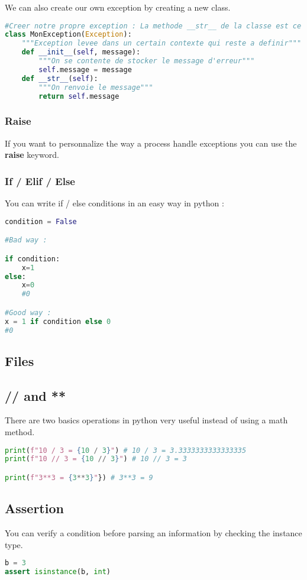 \documentclass[a4paper, 12pt]{article}
\begin{document}
We can also create our own exception by creating a new class.
\begin{lstlisting}[language=Python]
#Creer notre propre exception : La methode __str__ de la classe est ce qui est appele pour afficher le message d'erreur
class MonException(Exception):
    """Exception levee dans un certain contexte qui reste a definir"""
    def __init__(self, message):
        """On se contente de stocker le message d'erreur"""
        self.message = message
    def __str__(self):
        """On renvoie le message"""
        return self.message
\end{lstlisting}

\subsubsection{Raise}
\label{Raise}
If you want to personnalize the way a process handle exceptions you can use the \textbf{raise} keyword.


\subsubsection{If / Elif / Else}
\label{IEE}
You can write if / else conditions in an easy way in python :
\begin{lstlisting}[language=Python]
condition = False

#Bad way :

if condition:
	x=1
else:
	x=0
	#0

#Good way :
x = 1 if condition else 0
#0
\end{lstlisting}

\subsection{Files}

\subsection{// and **}
There are two basics operations in python very useful instead of using a math method.
\begin{lstlisting}[language=Python]
print(f"10 / 3 = {10 / 3}") # 10 / 3 = 3.3333333333333335
print(f"10 // 3 = {10 // 3}") # 10 // 3 = 3

print(f"3**3 = {3**3}"}) # 3**3 = 9
\end{lstlisting}

\subsection{Assertion}
\label{subsec:Assertion}
You can verify a condition before parsing an information by checking the instance type.
\begin{lstlisting}[language=Python]
b = 3
assert isinstance(b, int)
\end{lstlisting}
\end{document}
